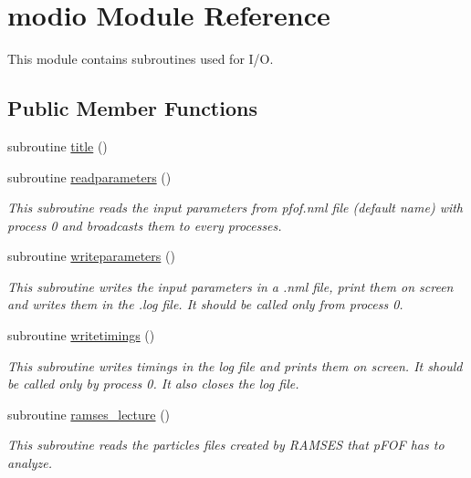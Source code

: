 \hypertarget{classmodio}{\section{modio Module Reference}
\label{classmodio}
}


This module contains subroutines used for I/\-O.  


\subsection*{Public Member Functions}
\begin{DoxyCompactItemize}
\item 
subroutine \hyperlink{classmodio_aefab9476e94da81a75351dbeee74e623}{title} ()
\item 
subroutine \hyperlink{classmodio_aa5e6b5f45cf8cfc091e8e7ff25a97c68}{readparameters} ()
\begin{DoxyCompactList}\small\item\em This subroutine reads the input parameters from pfof.\-nml file (default name) with process 0 and broadcasts them to every processes. \end{DoxyCompactList}\item 
subroutine \hyperlink{classmodio_ae764b324dac1a0991a9643a54d47aa36}{writeparameters} ()
\begin{DoxyCompactList}\small\item\em This subroutine writes the input parameters in a .nml file, print them on screen and writes them in the .log file. It should be called only from process 0. \end{DoxyCompactList}\item 
subroutine \hyperlink{classmodio_a6ba64be35b401e31cd35f96ea50bb0c4}{writetimings} ()
\begin{DoxyCompactList}\small\item\em This subroutine writes timings in the log file and prints them on screen. It should be called only by process 0. It also closes the log file. \end{DoxyCompactList}\item 
subroutine \hyperlink{classmodio_a7bb73858f091ddd46631bcb29022f803}{ramses\-\_\-lecture} ()
\begin{DoxyCompactList}\small\item\em This subroutine reads the particles files created by R\-A\-M\-S\-E\-S that p\-F\-O\-F has to analyze. \end{DoxyCompactList}\item 

\end{DoxyCompactItemize}
